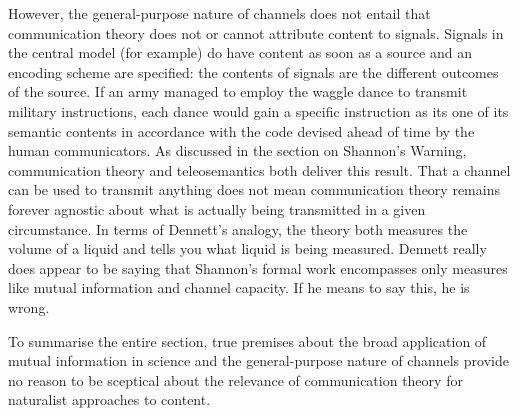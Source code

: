 However, the general-purpose nature of channels does not entail that communication theory does not or cannot attribute content to signals.
Signals in the central model (for example) do have content as soon as a source and an encoding scheme are specified: the contents of signals are the different outcomes of the source.
If an army managed to employ the waggle dance to transmit military instructions, each dance would gain a specific instruction as its one of its semantic contents in accordance with the code devised ahead of time by the human communicators.
As discussed in the section on Shannon's Warning, communication theory and teleosemantics both deliver this result.
That a channel can be used to transmit anything does not mean communication theory remains forever agnostic about what is actually being transmitted in a given circumstance.
In terms of Dennett's analogy, the theory both measures the volume of a liquid and tells you what liquid is being measured.
Dennett really does appear to be saying that Shannon's formal work encompasses only measures like mutual information and channel capacity.
If he means to say this, he is wrong.

To summarise the entire section, true premises about the broad application of mutual information in science and the general-purpose nature of channels provide no reason to be sceptical about the relevance of communication theory for naturalist approaches to content.
